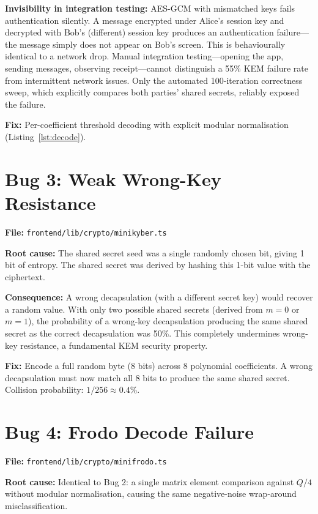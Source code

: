 \documentclass[12pt,a4paper]{report}
\begin{document}
\textbf{Invisibility in integration testing:} AES-GCM with mismatched keys fails
authentication silently. A message encrypted under Alice's session key and decrypted
with Bob's (different) session key produces an authentication failure---the message
simply does not appear on Bob's screen. This is behaviourally identical to a network
drop. Manual integration testing---opening the app, sending messages, observing
receipt---cannot distinguish a 55\% KEM failure rate from intermittent network issues.
Only the automated 100-iteration correctness sweep, which explicitly compares both
parties' shared secrets, reliably exposed the failure.

\textbf{Fix:} Per-coefficient threshold decoding with explicit modular normalisation
(Listing~\ref{lst:decode}).

\section{Bug 3: Weak Wrong-Key Resistance}

\textbf{File:} \texttt{frontend/lib/crypto/minikyber.ts}

\textbf{Root cause:} The shared secret seed was a single randomly chosen bit,
giving 1 bit of entropy. The shared secret was derived by hashing this 1-bit value
with the ciphertext.

\textbf{Consequence:} A wrong decapsulation (with a different secret key) would
recover a random value. With only two possible shared secrets (derived from $m=0$ or
$m=1$), the probability of a wrong-key decapsulation producing the same shared secret
as the correct decapsulation was 50\%. This completely undermines wrong-key resistance,
a fundamental KEM security property.

\textbf{Fix:} Encode a full random byte (8 bits) across 8 polynomial coefficients.
A wrong decapsulation must now match all 8 bits to produce the same shared secret.
Collision probability: $1/256 \approx 0.4\%$.

\section{Bug 4: Frodo Decode Failure}

\textbf{File:} \texttt{frontend/lib/crypto/minifrodo.ts}

\textbf{Root cause:} Identical to Bug 2: a single matrix element comparison against
$Q/4$ without modular normalisation, causing the same negative-noise wrap-around
misclassification.
\end{document}
